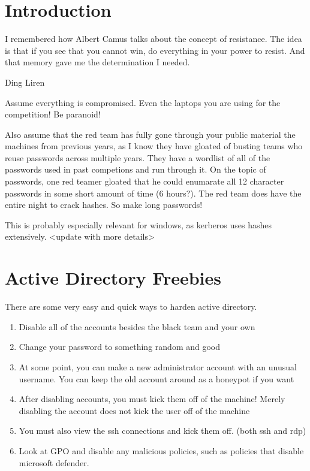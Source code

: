 \documentclass{article}
\begin{document}
\graphicspath{ {./Images/} }
\tableofcontents

\section{Introduction}
\epigraph{I remembered how Albert Camus talks about the concept of resistance. 
The idea is that if you see that you cannot win, do everything in your power to resist. And that memory gave me the determination I needed.}
{Ding Liren}

Assume everything is compromised. Even the laptops you are using for the competition! Be paranoid!

Also assume that the red team has fully gone through your public material the machines from previous years, as
I know they have gloated of busting teams who reuse passwords across multiple years.
They have a wordlist of all of the passwords used in past competions and run through it. 
On the topic of passwords, one red teamer gloated that he could enumarate all 12 character passwords in some short amount of time (6 hours?).
The red team does have the entire night to crack hashes. So make long passwords!

This is probably especially relevant for windows, as kerberos uses hashes extensively. <update with more details>

\section{Active Directory Freebies}
There are some very easy and quick ways to harden active directory.

\begin{enumerate}
        \item Disable all of the accounts besides the black team and your own
        \item Change your password to something random and good
        \item At some point, you can make a new administrator account with an unusual username. You can keep the old account around as a honeypot if you want
        \item After disabling accounts, you must kick them off of the machine! Merely disabling the account does not kick the user off of the machine
        \item You must also view the ssh connections and kick them off. (both ssh and rdp)
        \item Look at GPO and disable any malicious policies, such as policies that disable microsoft defender.
\end{enumerate}
\end{document}
